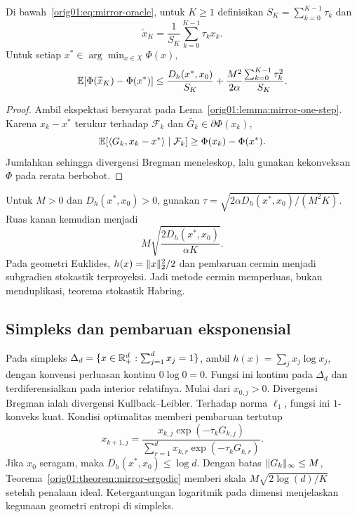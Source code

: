 \begin{theorem}
  \label{orig01:theorem:mirror-ergodic}
  Di bawah~\eqref{orig01:eq:mirror-oracle}, untuk $K\geq1$ definisikan
  $S_K=\sum_{k=0}^{K-1}\tau_k$ dan
  \begin{equation}
    \widetilde x_K=\frac1{S_K}\sum_{k=0}^{K-1}\tau_kx_k.
  \end{equation}
  Untuk setiap $x^*\in\arg\min_{x\in X}\Phi(x)$,
  \begin{equation}
    \label{orig01:eq:mirror-rate}
    \mathbb{E}[\Phi(\widetilde x_K)-\Phi(x^*)]
    \leq
    \frac{D_h(x^*,x_0)}{S_K}
    +\frac{M^2}{2\alpha}
      \frac{\sum_{k=0}^{K-1}\tau_k^2}{S_K}.
  \end{equation}
\end{theorem}

\begin{proof}
  Ambil ekspektasi bersyarat pada
  Lema~\ref{orig01:lemma:mirror-one-step}. Karena $x_k-x^*$ terukur terhadap
  $\mathcal F_k$ dan $\bar G_k\in\partial\Phi(x_k)$,
  \begin{equation}
    \mathbb{E}[\left\langle G_k , x_k-x^*\right\rangle\mid\mathcal F_k]
    \geq\Phi(x_k)-\Phi(x^*).
  \end{equation}
  Jumlahkan sehingga divergensi Bregman meneleskop, lalu gunakan kekonveksan
  $\Phi$ pada rerata berbobot.
\end{proof}

Untuk $M>0$ dan $D_h(x^*,x_0)>0$, gunakan
$\tau=\sqrt{2\alpha D_h(x^*,x_0)/(M^2K)}$. Ruas kanan kemudian menjadi
\begin{equation}
  M\sqrt{\frac{2D_h(x^*,x_0)}{\alpha K}}.
\end{equation}
Pada geometri Euklides, $h(x)=\|x\|_2^2/2$ dan pembaruan cermin menjadi
subgradien stokastik terproyeksi. Jadi metode cermin memperluas, bukan
menduplikasi, teorema stokastik Habring.

\subsection{Simpleks dan pembaruan eksponensial}
\label{orig01:subsection:entropy}

Pada simpleks
$\Delta_d=\{x\in\mathbb{R}_+^d:\sum_{j=1}^{d}x_j=1\}$, ambil
$h(x)=\sum_jx_j\log x_j$, dengan konvensi perluasan kontinu
$0\log0=0$. Fungsi ini kontinu pada $\Delta_d$ dan terdiferensialkan pada
interior relatifnya. Mulai dari $x_{0,j}>0$. Divergensi Bregman ialah
divergensi Kullback--Leibler. Terhadap norma $\ell_1$, fungsi ini
$1$-konveks kuat. Kondisi optimalitas memberi pembaruan tertutup
\begin{equation}
  \label{orig01:eq:exponentiated-update}
  x_{k+1,j}
  =\frac{x_{k,j}\exp(-\tau_kG_{k,j})}
         {\sum_{r=1}^{d}x_{k,r}\exp(-\tau_kG_{k,r})}.
\end{equation}
Jika $x_0$ seragam, maka $D_h(x^*,x_0)\leq\log d$. Dengan batas
$\|G_k\|_\infty\leq M$, Teorema~\ref{orig01:theorem:mirror-ergodic}
memberi skala $M\sqrt{2\log(d)/K}$ setelah penalaan ideal. Ketergantungan
logaritmik pada dimensi menjelaskan kegunaan geometri entropi di simpleks.

